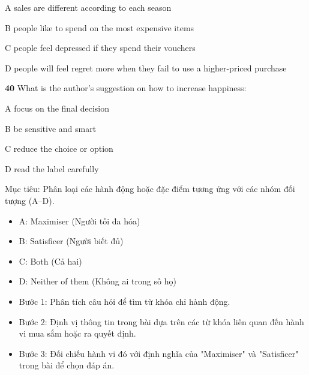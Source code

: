 \documentclass{../templateReading/cdreading}
\begin{document}
A   sales are different according to each season

B   people like to spend on the most expensive items

C   people feel depressed if they spend their vouchers

D   people will feel regret more when they fail to use a higher-priced purchase

\textbf{40} What is the author’s suggestion on how to increase happiness:

A   focus on the final decision

B   be sensitive and smart

C   reduce the choice or option

D   read the label carefully



Mục tiêu: Phân loại các hành động hoặc đặc điểm tương ứng với các nhóm đối tượng (A–D).
\begin{itemize}
\item A: Maximiser (Người tối đa hóa)
\item B: Satisficer (Người biết đủ)
\item C: Both (Cả hai)
\item D: Neither of them (Không ai trong số họ)
\end{itemize}

\begin{itemize}
\item Bước 1: Phân tích câu hỏi để tìm từ khóa chỉ hành động.
\item Bước 2: Định vị thông tin trong bài dựa trên các từ khóa liên quan đến hành vi mua sắm hoặc ra quyết định.
\item Bước 3: Đối chiếu hành vi đó với định nghĩa của "Maximiser" và "Satisficer" trong bài để chọn đáp án.
\end{itemize}
\end{document}
